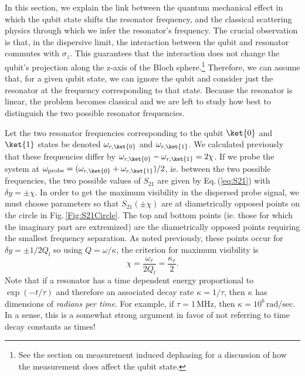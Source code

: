 
In this section, we explain the link between the quantum mechanical effect in which the qubit state shifts the resonator frequency, and the classical scattering physics through which we infer the resonator's frequency.
The crucial observation is that, in the dispersive limit, the interaction between the qubit and resonator commutes with $\sigma_z$.
This guarantees that the interaction does not change the qubit's projection along the z-axis of the Bloch sphere.\footnote{See the section on measurement induced dephasing for a discussion of how the measurement does affect the qubit state.}
Therefore, we can assume that, for a given qubit state, we can ignore the qubit and consider just the resonator at the frequency corresponding to that state.
Because the resonator is linear, the problem becomes classical and we are left to study how best to distinguish the two possible resonator frequencies.

Let the two resonator frequencies corresponding to the qubit $\ket{0}$ and $\ket{1}$ states be denoted $\omega_{r,\ket{0}}$ and $\omega_{r,\ket{1}}$.
We calculated previously that these frequencies differ by $\omega_{r,\ket{0}} - \omega_{r,\ket{1}} = 2\chi$.
If we probe the system at $\omega_{\text{probe}} = (\omega_{r,\ket{0}} + \omega_{r,\ket{1}})/2$, ie. between the two possible frequencies, the two possible values of $S_{21}$ are given by Eq.\,(\ref{eq:S21}) with $\delta y = \pm \chi$.
In order to get the maximum visibility in the dispersed probe signal, we must choose parameters so that $S_{21}(\pm \chi)$ are at diametrically opposed points on the circle in Fig.\,\ref{Fig:S21Circle}.
The top and bottom points (ie. those for which the imaginary part are extremized) are the diametrically opposed points requiring the smallest frequency separation.
As noted previously, these points occur for $\delta y = \pm 1/2Q_l$ so using $Q = \omega / \kappa$, the criterion for maximum visibility is
\begin{equation}
\chi = \frac{\omega_r}{2Q_l} = \frac{\kappa_r}{2}. \label{eq:chiVsKappa_r}
\end{equation}
Note that if a resonator has a time dependent energy proportional to $\exp(-t/\tau)$ and therefore an associated decay rate $\kappa = 1/\tau$, then $\kappa$ has dimensions of \emph{radians per time}.
For example, if $\tau=1 \, \text{MHz}$, then $\kappa = 10^6 \, \text{rad}/\text{sec}$.
In a sense, this is a somewhat strong argument in favor of not referring to time decay constants as times!
